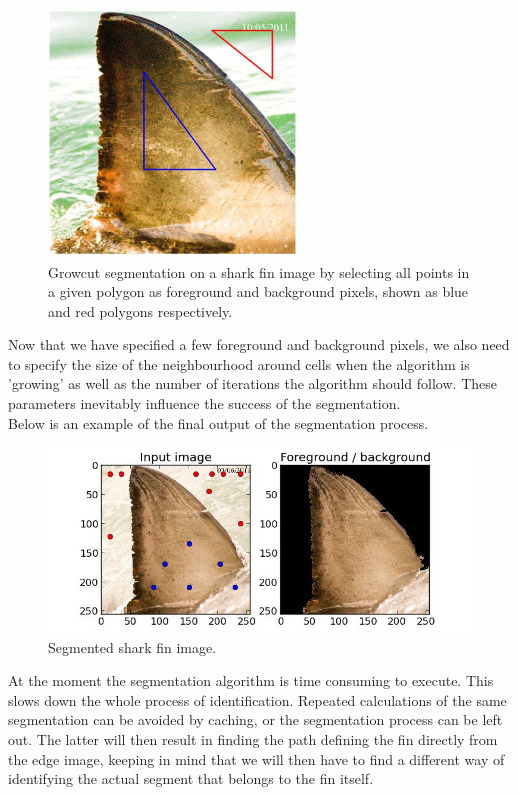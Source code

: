 \documentclass[a4paper,10pt]{article}
\begin{document}
\begin{figure}[H]
 \centering
 \includegraphics[width=2.6in]{polyshark.jpg}
 \caption{Growcut segmentation on a shark fin image by selecting all points in a
given polygon as foreground and background pixels, shown as blue and red
 polygons respectively.}
 \label{segmentation1}
\end{figure}

Now that we have specified a few foreground and background pixels, we also
need to specify the size of the neighbourhood around cells when the algorithm
is 'growing' as well as the number of iterations the algorithm should follow.
These parameters inevitably influence the success of the
segmentation. \\

Below is an example of the final output of the segmentation process. \\

\begin{figure}[H]
 \centering
 \includegraphics[width=5in]{segmentation.jpg}
 \caption{Segmented shark fin image.}
 \label{segmentation1}
\end{figure}

At the moment the segmentation algorithm is time consuming to execute.
This slows down the whole process of identification.  Repeated calculations of the
  same segmentation can be avoided by caching, 
or the segmentation process can be left out.  The latter will then result in
finding the path defining the fin directly from the edge image, keeping 
in mind that we will then have to find a different way of identifying the
  actual segment that belongs to the fin itself.
\end{document}
